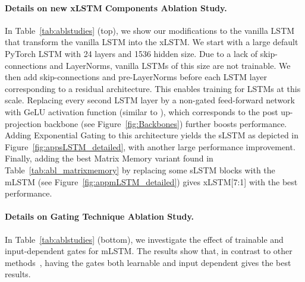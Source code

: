 \documentclass[dvipsnames]{article}
\newcommand{\MB}[1]{\textcolor{orange}{Max: #1}}
\begin{document}
\begin{appendix}
\paragraph{Details on new xLSTM Components Ablation Study.} In Table~\ref{tab:ablstudies} (top), we show our modifications to the vanilla LSTM that transform the vanilla LSTM into the xLSTM. 
We start with a large default PyTorch LSTM with 24 layers and 1536 hidden size. Due to a lack of skip-connections and LayerNorms, vanilla LSTMs of this size are not trainable. 
We then add skip-connections and pre-LayerNorms before each LSTM layer corresponding to a residual architecture. 
This enables training for LSTMs at this scale. 
Replacing every second LSTM layer by a non-gated feed-forward network with GeLU activation function (similar to \citeauthor{Vaswani:17}), which corresponds to the post up-projection backbone (see Figure~\ref{fig:Backbones}) further boosts performance. 
Adding Exponential Gating to this architecture yields the sLSTM as depicted in Figure~\ref{fig:appsLSTM_detailed}, with another large performance improvement.
Finally, adding the best Matrix Memory variant found in Table~\ref{tab:abl_matrixmemory} by replacing some sLSTM blocks with the mLSTM (see Figure~\ref{fig:appmLSTM_detailed}) gives xLSTM[7:1] with the best performance.

\paragraph{Details on Gating Technique Ablation Study.} In Table~\ref{tab:ablstudies} (bottom), we investigate the effect of trainable and input-dependent gates for mLSTM. The results show that, in contrast to other methods~\citep{Katharopoulos:20, Sun:23arxiv,Qin:23, Katsch:23, Yang:23arxiv, Qin:24arxiv, Peng:24arxivshort}, having the gates both learnable and input dependent gives the best results.




\end{appendix}
\end{document}
